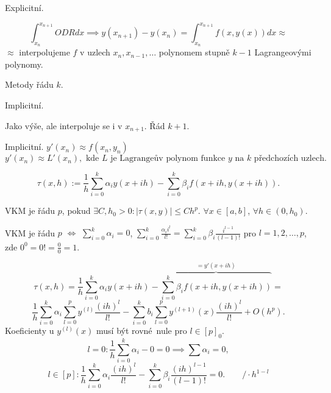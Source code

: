 \documentclass[12pt]{article}					%
\begin{document}
	\begin{definice}
		Explicitní.

		$$ \int_{x_n}^{x_{n+1}} ODR dx \implies y(x_{n+1}) - y(x_{n}) = \int_{x_n}^{x_{n+1}} f(x, y(x)) dx \approx $$
		$\approx$ interpolujeme $f$ v uzlech $x_n, x_{n-1}, …$ polynomem stupně $k-1$ Lagrangeovými polynomy.

		Metody řádu $k$.
	\end{definice}

	\begin{definice}
		Implicitní.

		Jako výše, ale interpoluje se i v $x_{n+1}$. Řád $k+1$.
	\end{definice}

	\begin{definice}
		Implicitní. $y'(x_n) \approx f(x_n, y_n)$
		$$ y'(x_n) \approx L'(x_n), \text{ kde $L$ je Lagrangeův polynom funkce $y$ na $k$ předchozích uzlech.} $$
	\end{definice}

	\begin{definice}
		$$ \tau(x, h) := \frac{1}{h} \sum_{i=0}^k \alpha_i y(x + i h) - \sum_{i=0}^k \beta_i f(x + ih, y(x + ih)). $$
	\end{definice}

	\begin{definice}
		VKM je řádu $p$, pokud $\exists C, h_0 > 0: |\tau(x, y)| ≤ C h^p$. $\forall x \in [a, b]$, $\forall h \in (0, h_0)$.
	\end{definice}

	\begin{veta}
		VKM je řádu $p$ $\Leftrightarrow$ $\sum_{i=0}^k \alpha_i = 0$, $\sum_{i=0}^k \frac{\alpha_i i^l}{l!} = \sum_{i=0}^k \beta_i \frac{i^{l-1}}{(l-1)!}$ pro $l = 1, 2, …, p$, zde $0^0 = 0! = \frac{0}{0} = 1$.

		\begin{dukazin}
			$$ \tau(x, h) = \frac{1}{h} \sum_{i=0}^k \alpha_i y(x + ih) - \overbrace{\sum_{i=0}^k \beta_i f(x + ih, y(x + ih))}^{=y'(x + ih)} = $$
			$$ \frac{1}{h} \sum_{i=0}^k \alpha_i \sum_{l=0}^p y^{(l)} \frac{(ih)^l}{l!} - \sum_{i=0}^k b_i \sum_{l=0}^p y^{(l+1)}(x) \frac{(ih)^l}{l!} + O(h^p). $$
			Koeficienty u $y^{(l)}(x)$ musí být rovné nule pro $l \in [p]_0$.
			$$ l = 0: \frac{1}{h} \sum_{i=0}^k \alpha_i - 0 = 0 \implies \sum \alpha_i = 0, $$
			$$ l \in [p]: \frac{1}{h} \sum_{i=0}^k \alpha_i \frac{(ih)^l}{l!} - \sum_{i=0}^k \beta_i \frac{(ih)^{l-1}}{(l-1)!} = 0. \qquad / ·h^{1-l} $$
		\end{dukazin}
	\end{veta}
\end{document}
